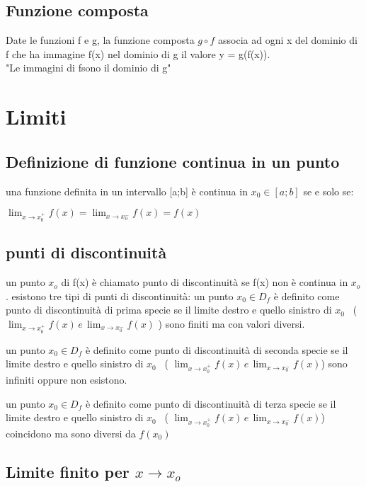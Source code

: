\documentclass[a4paper,11pt]{article}
\begin{document}
\subsection{Funzione composta}
Date le funzioni f e g, la funzione composta \( g \circ f \) associa ad ogni x del dominio di f che ha immagine f(x) nel dominio di g il valore y = g(f(x)). 
\\
"Le immagini di fsono il dominio di g"




\section{Limiti}

\subsection{Definizione di funzione continua in un punto}
una funzione definita in un intervallo [a;b] è continua in \(x_0 \in [a;b]\) se e solo se: 
\begin{center}
    \(
    \lim_{x\to x_{0}^+}f(x) =\lim_{x\to x_{0}^-}f(x) = f(x)
    \)
\end{center}

\subsection{punti di discontinuità}
un punto \(x_o\) di f(x) è chiamato punto di discontinuità se f(x) non è continua in \(x_o\).                                  
esistono tre tipi di punti di discontinuità:
un punto \( x_0 \in D_f \) è definito come punto di discontinuità di prima specie se il limite destro e quello sinistro di \( x_0 \) \, ( \( \lim_{x\to x_{0}^+}f(x) \, e \, \lim_{x\to x_{0}^-}f(x) \) ) sono finiti ma con valori diversi.


un punto \(x_0 \in D_f\) è definito come punto di discontinuità di seconda specie se il limite destro e quello sinistro di \(x_0\) \, ( \( \lim_{x\to x_{0}^+}f(x) \, e \, \lim_{x\to x_{0}^-}f(x) \)) sono infiniti oppure non esistono.

un punto \(x_0 \in D_f\) è definito come punto di discontinuità di terza specie se il limite destro e quello sinistro di \(x_0\) \, ( \( \lim_{x\to x_{0}^+}f(x) \, e \, \lim_{x\to x_{0}^-}f(x) \)) coincidono ma sono diversi da \(f(x_0)\)

\subsection{Limite finito per \( x \to x_o \)}
\end{document}
